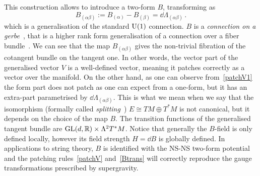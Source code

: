\documentclass[debug]{phd}
\begin{document}
This construction allows to introduce a two-form $B$, transforming as 	
\begin{equation}\label{Btrans}
									B_{(\alpha\beta)}:= B_{(\alpha)} - B_{(\beta)} = \dd \Lambda_{(\alpha \beta)}\, .
								\end{equation}				
which is a generalisation of the standard $\mathrm{U}(1)$ connection. 
					$B$ is a \emph{connection on a gerbe}~\cite{HitchinLagrangian}, that is a higher rank form generalisation of a connection over a fiber bundle~\cite{Nakahara}. 
					We can see that the map $B_{(\alpha\beta)}$ gives the non-trivial fibration of the cotangent bundle on the tangent one.
					In other words, the vector part of the generalised vector $V$ is a well-defined vector, meaning it patches correctly as a vector over the manifold.
					On the other hand, as one can observe from~\eqref{patchV1} the form part does not patch as one can expect from a one-form, but it has an extra-part parametrised by $\dd \Lambda_{(\alpha\beta)}$.
					This is what we mean when we say that the isomorphism (formally called \emph{splitting}~\cite{Hatcher}) $E \cong TM \oplus T^*M$ is not canonical, but it depends on the choice of the map $B$.
					The transition functions of the generalised tangent bundle are $\mathrm{GL}(d, \mathbb{R}) \times \Lambda^2 T^*M$. 
					Notice that generally the $B$-field is only defined locally, however its field strength $H = \dd B$ is globally defined. 
					In applications to string theory, $B$ is identified with the NS-NS two-form potential and the patching rules~\eqref{patchV} and~\eqref{Btrans} will correctly reproduce the gauge transformations prescribed by supergravity.
\end{document}
